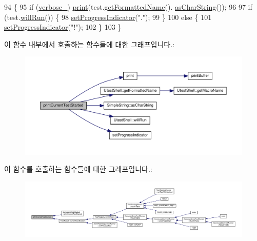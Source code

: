 \begin{DoxyCode}
94 \{
95     \textcolor{keywordflow}{if} (\hyperlink{class_test_output_a86126da532c138842a42d8e9a52b0806}{verbose\_}) \hyperlink{class_test_output_a321b5c489a90374cb61c34fe5d2253ef}{print}(test.\hyperlink{class_utest_shell_af1b3219048ca8ae0e2bb935b813b4b92}{getFormattedName}().
      \hyperlink{class_simple_string_af7c0efaf31f42553f05719903c830be1}{asCharString}());
96 
97     \textcolor{keywordflow}{if} (test.\hyperlink{class_utest_shell_afa35d9bf0fd1c772b04f48d89d318a70}{willRun}()) \{
98        \hyperlink{class_test_output_a97c09fc275d40b7ec559aaa91843cdcd}{setProgressIndicator}(\textcolor{stringliteral}{"."});
99     \}
100     \textcolor{keywordflow}{else} \{
101        \hyperlink{class_test_output_a97c09fc275d40b7ec559aaa91843cdcd}{setProgressIndicator}(\textcolor{stringliteral}{"!"});
102     \}
103 \}
\end{DoxyCode}


이 함수 내부에서 호출하는 함수들에 대한 그래프입니다.\+:
\nopagebreak
\begin{figure}[H]
\begin{center}
\leavevmode
\includegraphics[width=350pt]{class_test_output_aa3e637e450766d2d1a6090f2bab8bf08_cgraph}
\end{center}
\end{figure}




이 함수를 호출하는 함수들에 대한 그래프입니다.\+:
\nopagebreak
\begin{figure}[H]
\begin{center}
\leavevmode
\includegraphics[width=350pt]{class_test_output_aa3e637e450766d2d1a6090f2bab8bf08_icgraph}
\end{center}
\end{figure}


